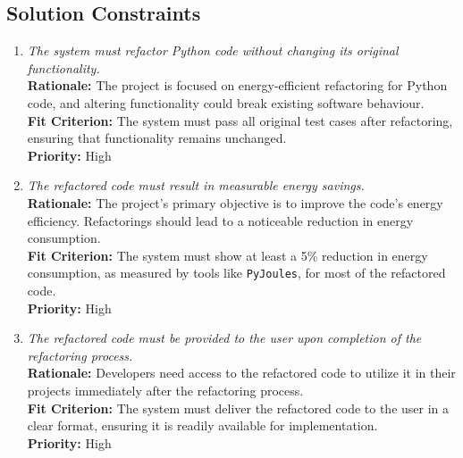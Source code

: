 \documentclass[12pt]{article}
\begin{document}
\subsection{Solution Constraints}
\begin{enumerate}[label=MD-SL \arabic*., wide=0pt, leftmargin=*]
    \item \emph{The system must refactor Python code without changing its original functionality.}\\[2mm]
    {\bf Rationale:} The project is focused on energy-efficient refactoring for Python code, and altering functionality could break existing software behaviour.\\
    {\bf Fit Criterion:} The system must pass all original test cases after refactoring, ensuring that functionality remains unchanged.\\
    {\bf Priority:} High
    \item \emph{The refactored code must result in measurable energy savings.}\\[2mm]
    {\bf Rationale:} The project's primary objective is to improve the code's energy efficiency. Refactorings should lead to a noticeable reduction in energy consumption.\\
    {\bf Fit Criterion:} The system must show at least a 5\% reduction in energy consumption, as measured by tools like \texttt{PyJoules}, for most of the refactored code.\\
    {\bf Priority:} High
    \item \emph{The refactored code must be provided to the user upon completion of the refactoring process.}\\[2mm]
    {\bf Rationale:} Developers need access to the refactored code to utilize it in their projects immediately after the refactoring process.\\
    {\bf Fit Criterion:} The system must deliver the refactored code to the user in a clear format, ensuring it is readily available for implementation.\\
    {\bf Priority:} High
\end{enumerate}
\end{document}
